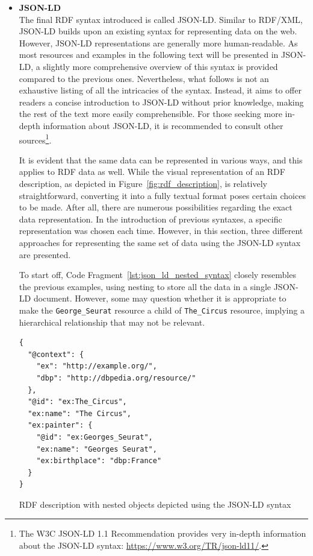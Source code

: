 \begin{itemize}
    \item \textbf{JSON-LD}\\
    The final RDF syntax introduced is called JSON-LD. Similar to RDF/XML, JSON-LD builds upon an existing syntax for representing data on the web. However, JSON-LD representations are generally more human-readable. As most resources and examples in the following text will be presented in JSON-LD, a slightly more comprehensive overview of this syntax is provided compared to the previous ones. Nevertheless, what follows is not an exhaustive listing of all the intricacies of the syntax. Instead, it aims to offer readers a concise introduction to JSON-LD without prior knowledge, making the rest of the text more easily comprehensible. For those seeking more in-depth information about JSON-LD, it is recommended to consult other sources\footnote{The W3C JSON-LD 1.1 Recommendation provides very in-depth information about the JSON-LD syntax: \url{https://www.w3.org/TR/json-ld11/}.}.

    It is evident that the same data can be represented in various ways, and this applies to RDF data as well. While the visual representation of an RDF description, as depicted in Figure~\ref{fig:rdf_description}, is relatively straightforward, converting it into a fully textual format poses certain choices to be made. After all, there are numerous possibilities regarding the exact data representation. In the introduction of previous syntaxes, a specific representation was chosen each time. However, in this section, three different approaches for representing the same set of data using the JSON-LD syntax are presented.

    To start off, Code Fragment~\ref{lst:json_ld_nested_syntax} closely resembles the previous examples, using nesting to store all the data in a single JSON-LD document. However, some may question whether it is appropriate to make the \texttt{George_Seurat} resource a child of \texttt{The_Circus} resource, implying a hierarchical relationship that may not be relevant.

    \begin{listing}[htbp]
        \begin{verbatim}
{
  "@context": {
    "ex": "http://example.org/",
    "dbp": "http://dbpedia.org/resource/"
  },
  "@id": "ex:The_Circus",
  "ex:name": "The Circus",
  "ex:painter": {
    "@id": "ex:Georges_Seurat",
    "ex:name": "Georges Seurat",
    "ex:birthplace": "dbp:France"
  }
}
        \end{verbatim}
        \caption{RDF description with nested objects depicted using the JSON-LD syntax}
        \label{lst:json_ld_nested_syntax}
    \end{listing}


\end{itemize}
